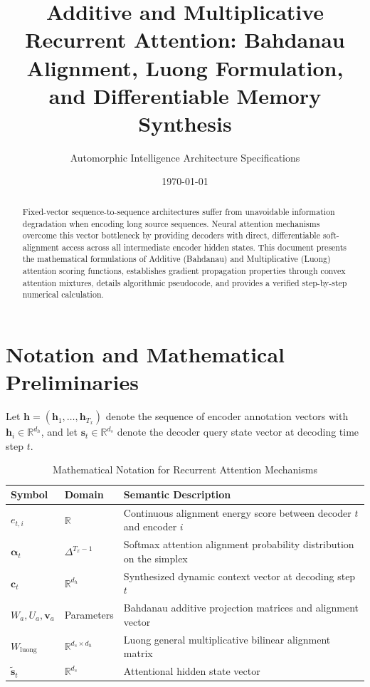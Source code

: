 \documentclass[11pt,a4paper]{article}
\title{Additive and Multiplicative Recurrent Attention: Bahdanau Alignment, Luong Formulation, and Differentiable Memory Synthesis}
\author{Automorphic Intelligence Architecture Specifications}
\date{\today}
\theoremstyle{definition}
\begin{document}
\maketitle

\begin{abstract}
Fixed-vector sequence-to-sequence architectures suffer from unavoidable information degradation when encoding long source sequences. Neural attention mechanisms overcome this vector bottleneck by providing decoders with direct, differentiable soft-alignment access across all intermediate encoder hidden states. This document presents the mathematical formulations of Additive (Bahdanau) and Multiplicative (Luong) attention scoring functions, establishes gradient propagation properties through convex attention mixtures, details algorithmic pseudocode, and provides a verified step-by-step numerical calculation.
\end{abstract}

\section{Notation and Mathematical Preliminaries}

Let $\mathbf{h} = (\mathbf{h}_1, \dots, \mathbf{h}_{T_x})$ denote the sequence of encoder annotation vectors with $\mathbf{h}_i \in \mathbb{R}^{d_h}$, and let $\mathbf{s}_t \in \mathbb{R}^{d_s}$ denote the decoder query state vector at decoding time step $t$.

\begin{table}[h]
\centering
\caption{Mathematical Notation for Recurrent Attention Mechanisms}
\begin{tabular}{lll}
\toprule
\textbf{Symbol} & \textbf{Domain} & \textbf{Semantic Description} \\
\midrule
$e_{t, i}$ & $\mathbb{R}$ & Continuous alignment energy score between decoder $t$ and encoder $i$ \\
$\boldsymbol{\alpha}_t$ & $\Delta^{T_x - 1}$ & Softmax attention alignment probability distribution on the simplex \\
$\mathbf{c}_t$ & $\mathbb{R}^{d_h}$ & Synthesized dynamic context vector at decoding step $t$ \\
$W_a, U_a, \mathbf{v}_a$ & Parameters & Bahdanau additive projection matrices and alignment vector \\
$W_{\text{luong}}$ & $\mathbb{R}^{d_s \times d_h}$ & Luong general multiplicative bilinear alignment matrix \\
$\tilde{\mathbf{s}}_t$ & $\mathbb{R}^{d_s}$ & Attentional hidden state vector \\
\bottomrule
\end{tabular}
\end{table}
\end{document}
